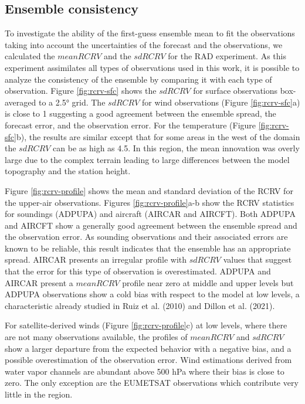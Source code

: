 \documentclass[final,5p,times,twocolumn,authoryear]{elsarticle} %
\begin{document}
\hypertarget{ensemble-consistency}{%
\subsection{Ensemble consistency}\label{ensemble-consistency}}

To investigate the ability of the first-guess ensemble mean to fit the observations taking into account the uncertainties of the forecast and the observations, we calculated the \(mean RCRV\) and the \(sd RCRV\) for the RAD experiment. As this experiment assimilates all types of observations used in this work, it is possible to analyze the consistency of the ensemble by comparing it with each type of observation. Figure \ref{fig:rcrv-sfc} shows the \(sd RCRV\) for surface observations box-averaged to a 2.5° grid. The \(sd RCRV\) for wind observations (Figure \ref{fig:rcrv-sfc}a) is close to 1 suggesting a good agreement between the ensemble spread, the forecast error, and the observation error. For the temperature (Figure \ref{fig:rcrv-sfc}b), the results are similar except that for some areas in the west of the domain the \(sd RCRV\) can be as high as 4.5. In this region, the mean innovation was overly large due to the complex terrain leading to large differences between the model topography and the station height.

Figure \ref{fig:rcrv-profile} shows the mean and standard deviation of the RCRV for the upper-air observations. Figures \ref{fig:rcrv-profile}a-b show the RCRV statistics for soundings (ADPUPA) and aircraft (AIRCAR and AIRCFT). Both ADPUPA and AIRCFT show a generally good agreement between the ensemble spread and the observation error. As sounding observations and their associated errors are known to be reliable, this result indicates that the ensemble has an appropriate spread. AIRCAR presents an irregular profile with \(sd RCRV\) values that suggest that the error for this type of observation is overestimated. ADPUPA and AIRCAR present a \(mean RCRV\) profile near zero at middle and upper levels but ADPUPA observations show a cold bias with respect to the model at low levels, a characteristic already studied in Ruiz et al. (2010) and Dillon et al. (2021).

For satellite-derived winds (Figure \ref{fig:rcrv-profile}c) at low levels, where there are not many observations available, the profiles of \(mean RCRV\) and \(sd RCRV\) show a larger departure from the expected behavior with a negative bias, and a possible overestimation of the observation error. Wind estimations derived from water vapor channels are abundant above 500 hPa where their bias is close to zero. The only exception are the EUMETSAT observations which contribute very little in the region.
\end{document}
